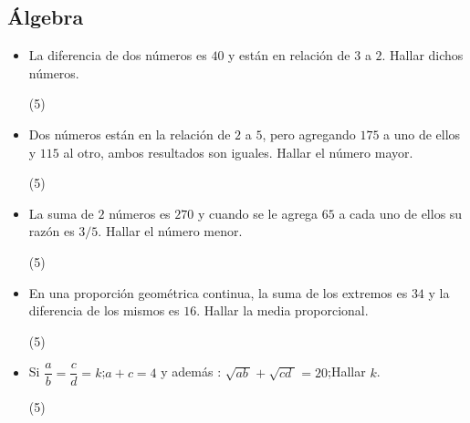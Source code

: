 \documentclass[10pt, twocolumn, landscape, a4paper]{article}
\begin{document}
\subsection*{Álgebra}
\begin{itemize}
\item{La diferencia de dos números es $40$ y están en relación de $3$ a $2$. Hallar dichos números.
\begin{tasks}(5)
\end{tasks}
}
\item{Dos números están en la relación de $2$ a $5$, pero agregando $175$ a uno de ellos y $115$ al otro, ambos resultados son iguales. Hallar el número mayor.
\begin{tasks}(5)
\end{tasks}
}
\item{La suma de $2$ números es $270$ y cuando se le agrega $65$ a cada uno de ellos su razón es $3/5$. Hallar el número menor.
\begin{tasks}(5)
\end{tasks}
}
\item{En una proporción geométrica continua, la suma de los extremos es $34$ y la diferencia de los mismos es $16$. Hallar la media proporcional.
\begin{tasks}(5)
\end{tasks}
}
\item{Si \quad$\dfrac{a}{b} = \dfrac{c}{d} = k$;\quad $a + c = 4$ y además : $\sqrt{ab\,} + \sqrt{cd\;} = 20$;\quad Hallar $k$.
\begin{tasks}(5)
\end{tasks}
}
\end{itemize}
\end{document}
